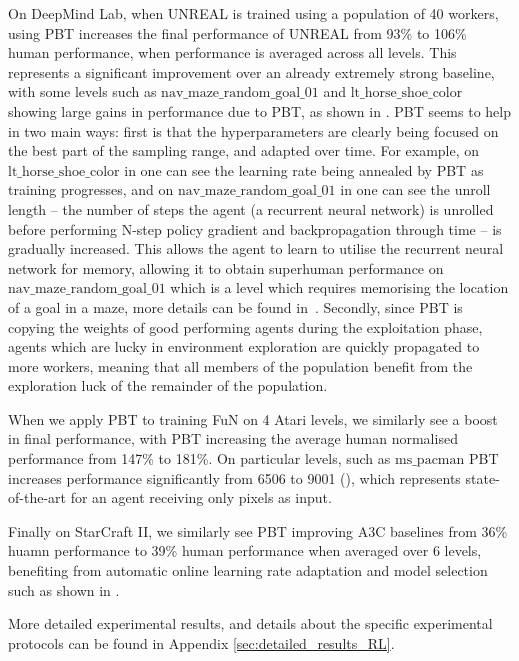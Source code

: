 On DeepMind Lab, when UNREAL is trained using a population of 40 workers, using PBT increases the final performance of UNREAL from 93\% to 106\% human performance, when performance is averaged across all levels. This represents a significant improvement over an already extremely strong baseline, with some levels such as $\mathrm{nav\_maze\_random\_goal\_01}$ and $\mathrm{lt\_horse\_shoe\_color}$ showing large gains in performance due to PBT, as shown in . PBT seems to help in two main ways: first is that the hyperparameters are clearly being focused on the best part of the sampling range, and adapted over time. For example, on $\mathrm{lt\_horse\_shoe\_color}$ in  one can see the learning rate being annealed by PBT as training progresses, and on $\mathrm{nav\_maze\_random\_goal\_01}$ in  one can see the unroll length -- the number of steps the agent (a recurrent neural network) is unrolled before performing N-step policy gradient and backpropagation through time -- is gradually increased. This allows the agent to learn to utilise the recurrent neural network for memory, allowing it to obtain superhuman performance on $\mathrm{nav\_maze\_random\_goal\_01}$ which is a level which requires memorising the location of a goal in a maze, more details can be found in~\citep{jaderberg2016reinforcement}. Secondly, since PBT is copying the weights of good performing agents during the exploitation phase, agents which are lucky in environment exploration are quickly propagated to more workers, meaning that all members of the population benefit from the exploration luck of the remainder of the population.

When we apply PBT to training FuN on 4 Atari levels, we similarly see a boost in final performance, with PBT increasing the average human normalised performance from 147\% to 181\%. On particular levels, such as $\mathrm{ms\_pacman}$ PBT increases performance significantly from 6506 to 9001 (), which represents state-of-the-art for an agent receiving only pixels as input. 

Finally on StarCraft II, we similarly see PBT improving A3C baselines from 36\% huamn performance to 39\% human performance when averaged over 6 levels, benefiting from automatic online learning rate adaptation and model selection such as shown in .

More detailed experimental results, and details about the specific experimental protocols can be found in Appendix \ref{sec:detailed_results_RL}.



